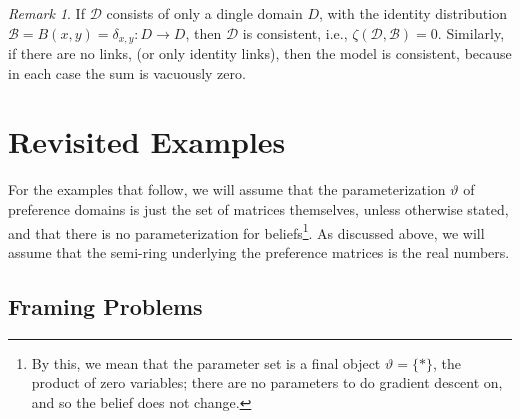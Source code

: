 \documentclass{article}
\theoremstyle{plain}
\newtheorem{prop}[theorem]{Proposition}
\theoremstyle{definition}
\theoremstyle{remark}
\newtheorem*{remark}{Remark}
\newcommand{\todo}[1]{{\color{red}\large\textbf{[todo}: {\normalsize\itshape#1}\textbf{]}}}
\begin{document}
 	\begin{remark}
 		If $\mathcal D$ consists of only a dingle domain $D$, with the identity distribution $\mathcal B = {B(x,y) = \delta_{x,y}: D \to D}$, then $\mathcal D$ is consistent, i.e., $\zeta(\mathcal D, \mathcal B) = 0$. Similarly, if there are no links, (or only identity links), then the model is consistent, because in each case the sum is vacuously zero. 
 	\end{remark}
 	

	
		
	\section{Revisited Examples}
	For the examples that follow, we will assume that the parameterization $\vartheta$ of preference domains is just the set of matrices themselves, unless otherwise stated, and that there is no parameterization for beliefs\footnote{By this, we mean that the parameter set is a final object $\vartheta = \{*\}$, the product of zero variables; there are no parameters to do gradient descent on, and so the belief does not change. }. As discussed above, we will assume that the semi-ring underlying the preference matrices is the real numbers.
	
	\subsection{Framing Problems}
	
	
\end{document}
